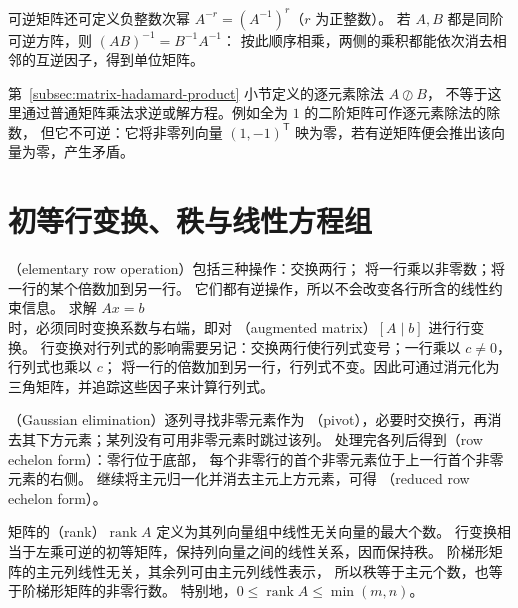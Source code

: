 \documentclass[UTF8,12pt,a4paper,fontset=fandol]{ctexart}
\begin{document}
可逆矩阵还可定义负整数次幂 $A^{-r}=(A^{-1})^r$（$r$ 为正整数）。
若 $A,B$ 都是同阶可逆方阵，则 $(AB)^{-1}=B^{-1}A^{-1}$：
按此顺序相乘，两侧的乘积都能依次消去相邻的互逆因子，得到单位矩阵。

第~\ref{subsec:matrix-hadamard-product} 小节定义的逐元素除法 $A\oslash B$，
不等于这里通过普通矩阵乘法求逆或解方程。例如全为 $1$ 的二阶矩阵可作逐元素除法的除数，
但它不可逆：它将非零列向量 $(1,-1)^{\mathsf T}$ 映为零，若有逆矩阵便会推出该向量为零，产生矛盾。

\section{初等行变换、秩与线性方程组}
\label{sec:matrix-elimination-rank}

（elementary row operation）包括三种操作：交换两行；
将一行乘以非零数；将一行的某个倍数加到另一行。
它们都有逆操作，所以不会改变各行所含的线性约束信息。
求解 $Ax=b$ 时，必须同时变换系数与右端，即对
（augmented matrix）$[A\mid b]$ 进行行变换。
行变换对行列式的影响需要另记：交换两行使行列式变号；一行乘以 $c\ne0$，行列式也乘以 $c$；
将一行的倍数加到另一行，行列式不变。因此可通过消元化为三角矩阵，并追踪这些因子来计算行列式。

（Gaussian elimination）逐列寻找非零元素作为
（pivot），必要时交换行，再消去其下方元素；某列没有可用非零元素时跳过该列。
处理完各列后得到（row echelon form）：零行位于底部，
每个非零行的首个非零元素位于上一行首个非零元素的右侧。
继续将主元归一化并消去主元上方元素，可得
（reduced row echelon form）。

矩阵的（rank）$\operatorname{rank}A$ 定义为其列向量组中线性无关向量的最大个数。
行变换相当于左乘可逆的初等矩阵，保持列向量之间的线性关系，因而保持秩。
阶梯形矩阵的主元列线性无关，其余列可由主元列线性表示，
所以秩等于主元个数，也等于阶梯形矩阵的非零行数。
特别地，$0\le\operatorname{rank}A\le\min(m,n)$。
\end{document}
